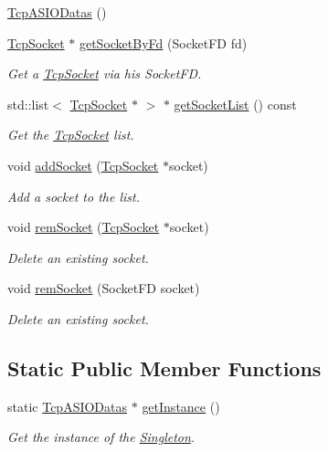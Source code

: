 \begin{DoxyCompactItemize}
\item 
\hyperlink{classmognetwork_1_1_tcp_a_s_i_o_datas_aefa4425a076fbfe35ff9420e63aa5a41}{Tcp\-A\-S\-I\-O\-Datas} ()
\item 
\hyperlink{classmognetwork_1_1_tcp_socket}{Tcp\-Socket} $\ast$ \hyperlink{classmognetwork_1_1_tcp_a_s_i_o_datas_a97b9895517d49687c35663ec4de5453e}{get\-Socket\-By\-Fd} (Socket\-F\-D fd)
\begin{DoxyCompactList}\small\item\em Get a \hyperlink{classmognetwork_1_1_tcp_socket}{Tcp\-Socket} via his Socket\-F\-D. \end{DoxyCompactList}\item 
std\-::list$<$ \hyperlink{classmognetwork_1_1_tcp_socket}{Tcp\-Socket} $\ast$ $>$ $\ast$ \hyperlink{classmognetwork_1_1_tcp_a_s_i_o_datas_a7c5c65122f57d2186fb735416a790763}{get\-Socket\-List} () const 
\begin{DoxyCompactList}\small\item\em Get the \hyperlink{classmognetwork_1_1_tcp_socket}{Tcp\-Socket} list. \end{DoxyCompactList}\item 
void \hyperlink{classmognetwork_1_1_tcp_a_s_i_o_datas_aa52b9fb9195d372f5b647d7631cf5b72}{add\-Socket} (\hyperlink{classmognetwork_1_1_tcp_socket}{Tcp\-Socket} $\ast$socket)
\begin{DoxyCompactList}\small\item\em Add a socket to the list. \end{DoxyCompactList}\item 
void \hyperlink{classmognetwork_1_1_tcp_a_s_i_o_datas_a49a15b15392fadb168ae376c72b7f9e0}{rem\-Socket} (\hyperlink{classmognetwork_1_1_tcp_socket}{Tcp\-Socket} $\ast$socket)
\begin{DoxyCompactList}\small\item\em Delete an existing socket. \end{DoxyCompactList}\item 
void \hyperlink{classmognetwork_1_1_tcp_a_s_i_o_datas_a4699eb56dd2868e62babcea3d2b6da00}{rem\-Socket} (Socket\-F\-D socket)
\begin{DoxyCompactList}\small\item\em Delete an existing socket. \end{DoxyCompactList}\end{DoxyCompactItemize}
\subsection*{Static Public Member Functions}
\begin{DoxyCompactItemize}
\item 
static \hyperlink{classmognetwork_1_1_tcp_a_s_i_o_datas}{Tcp\-A\-S\-I\-O\-Datas} $\ast$ \hyperlink{classmognetwork_1_1_tcp_a_s_i_o_datas_af07cf0c2b0e71e370d7975a97ba7cc83}{get\-Instance} ()
\begin{DoxyCompactList}\small\item\em Get the instance of the \hyperlink{classmognetwork_1_1_singleton}{Singleton}. \end{DoxyCompactList}\end{DoxyCompactItemize}


